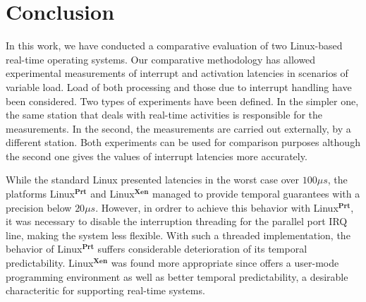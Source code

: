 \documentclass{acm_proc_article-sp}
\begin{document}
\section{Conclusion}
\label{sec:conc}

In this work, we have conducted a comparative evaluation of two Linux-based
real-time operating systems. Our comparative methodology has allowed experimental
measurements of interrupt and activation latencies in scenarios of variable
load. Load of both processing and those due to interrupt handling have been
considered. Two types of experiments have been defined.  In the simpler one, the
same station that deals with real-time activities is responsible for the
measurements. In the second, the measurements are carried out externally, by a
different station. Both experiments can be used for comparison purposes although the
second one gives the values of interrupt latencies more accurately.

While the standard Linux presented latencies in the worst case over $100 \mu s$, the
platforms Linux$^{\mathbf{Prt}}$ and Linux$^{\mathbf{Xen}}$ managed to provide
temporal guarantees with a precision below $20 \mu s$. However, in ordrer to achieve
this behavior with Linux$^{\mathbf{Prt}}$, it was necessary to disable the
interruption threading for the parallel port IRQ line, making the system less
flexible. With such a threaded implementation, the behavior of
Linux$^{\mathbf{Prt}}$ suffers considerable deterioration of its temporal
predictability.  Linux$^{\mathbf{Xen}}$ was found more appropriate since offers a
user-mode programming environment as well as better temporal predictability, a
desirable characteritic for supporting real-time systems.

 
\end{document}
